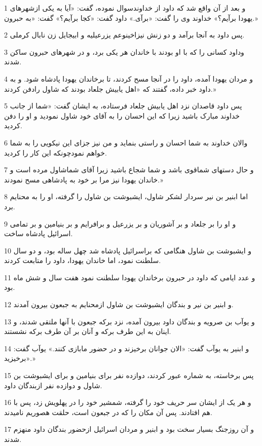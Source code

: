 \par 1 و بعد از آن واقع شد که داود از خداوندسوال نموده، گفت: «آیا به یکی ازشهرهای یهودا برآیم؟» خداوند وی را گفت: «برآی.» داود گفت: «کجا برآیم؟» گفت: «به حبرون.»
\par 2 پس داود به آنجا برآمد و دو زنش نیزاخینوعم یزرعیلیه و ابیجایل زن نابال کرملی.
\par 3 وداود کسانی را که با او بودند با خاندان هر یکی برد، و در شهرهای حبرون ساکن شدند.
\par 4 و مردان یهودا آمده، داود را در آنجا مسح کردند، تا برخاندان یهودا پادشاه شود. و به داود خبر داده، گفتند که «اهل یابیش جلعاد بودند که شاول رادفن کردند.»
\par 5 پس داود قاصدان نزد اهل یابیش جلعاد فرستاده، به ایشان گفت: «شما از جانب خداوند مبارک باشید زیرا که این احسان را به آقای خود شاول نمودید و او را دفن کردید.
\par 6 والان خداوند به شما احسان و راستی بنماید و من نیز جزای این نیکویی را به شما خواهم نمودچونکه این کار را کردید.
\par 7 و حال دستهای شماقوی باشد و شما شجاع باشید زیرا آقای شماشاول مرده است و خاندان یهودا نیز مرا بر خود به پادشاهی مسح نمودند.»
\par 8 اما ابنیر بن نیر سردار لشکر شاول، ایشبوشت بن شاول را گرفته، او را به محنایم برد.
\par 9 و او را بر جلعاد و بر آشوریان و بر یزرعیل و برافرایم و بر بنیامین و بر تمامی اسرائیل پادشاه ساخت.
\par 10 و ایشبوشت بن شاول هنگامی که براسرائیل پادشاه شد چهل ساله بود، و دو سال سلطنت نمود، اما خاندان یهودا، داود را متابعت کردند.
\par 11 و عدد ایامی که داود در حبرون برخاندان یهودا سلطنت نمود هفت سال و شش ماه بود.
\par 12 و ابنیر بن نیر و بندگان ایشبوشت بن شاول ازمحنایم به جبعون بیرون آمدند.
\par 13 و یوآب بن صرویه و بندگان داود بیرون آمده، نزد برکه جبعون با آنها ملتقی شدند، و اینان به این طرف برکه و آنان بر آن طرف برکه نشستند.
\par 14 و ابنیر به یوآب گفت: «الان جوانان برخیزند و در حضور مابازی کنند.» یوآب گفت: «برخیزید.»
\par 15 پس برخاسته، به شماره عبور کردند، دوازده نفر برای بنیامین و برای ایشبوشت بن شاول و دوازده نفر ازبندگان داود.
\par 16 و هر یک از ایشان سر حریف خود را گرفته، شمشیر خود را در پهلویش زد، پس با هم افتادند. پس آن مکان را که در جبعون است، حلقت هصوریم نامیدند.
\par 17 و آن روزجنگ بسیار سخت بود و ابنیر و مردان اسرائیل ازحضور بندگان داود منهزم شدند.
